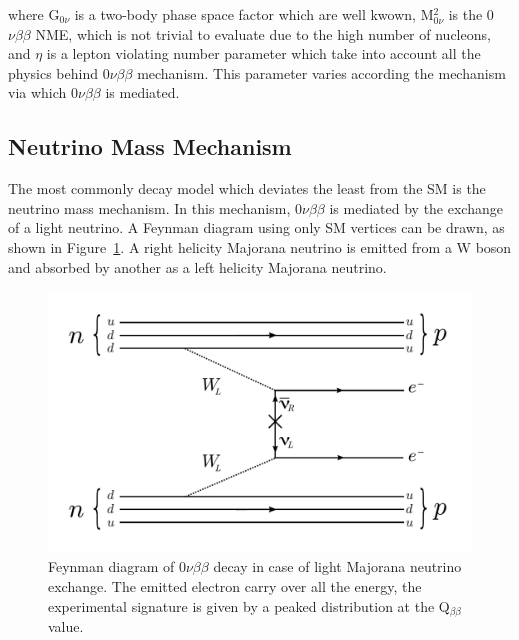 \documentclass[main.tex]{subfiles}
\begin{document}
\bigskip


\NI where G$_{\text{0}\nu}$ is a two-body phase space factor which are well kwown, M$^\text{2}_{\text{0}\nu}$ is the 0$\nu\beta\beta$ NME, which is not trivial to evaluate due to the high number of nucleons, and $\eta$ is a lepton violating number parameter which take into account all the physics behind 0$\nu\beta\beta$ mechanism. This parameter varies according the mechanism via which 0$\nu\beta\beta$ is mediated.  


\FloatBarrier


\subsection{Neutrino Mass Mechanism}\label{sec:NMM}



\NI The most commonly decay model which deviates the least from the SM is the neutrino mass mechanism. In this mechanism, 0$\nu\beta\beta$ is mediated by the exchange of a light neutrino. A Feynman diagram using only SM vertices can be drawn, as shown in Figure~\ref{0nubbNMM}. A right helicity Majorana neutrino is emitted from a W boson and absorbed by another as a left helicity Majorana neutrino. 


\begin{figure}[h!]
\begin{center}
\includegraphics[scale=0.5]{pictures/Chap2/0nubbFeynmanDiagram_NMM.pdf}
\caption{Feynman diagram of 0$\nu\beta\beta$ decay in case of light Majorana neutrino exchange. The emitted electron carry over all the energy, the experimental signature is given by a peaked distribution at the Q$_{\beta\beta}$ value.}
\label{0nubbNMM}
\end{center}
\end{figure}
\end{document}
